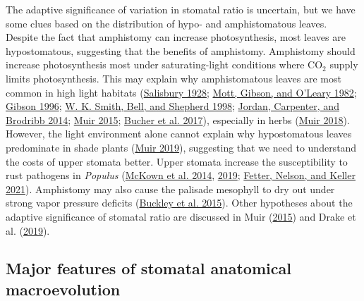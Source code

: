 \documentclass[
  12pt,
]{article}
\begin{document}
The adaptive significance of variation in stomatal ratio is uncertain, but we have some clues based on the distribution of hypo- and amphistomatous leaves. Despite the fact that amphistomy can increase photosynthesis, most leaves are hypostomatous, suggesting that the benefits of amphistomy. Amphistomy should increase photosynthesis most under saturating-light conditions where CO\(_2\) supply limits photosynthesis. This may explain why amphistomatous leaves are most common in high light habitats (\protect\hyperlink{ref-salisbury_i_1928}{Salisbury 1928}; \protect\hyperlink{ref-mott_adaptive_1982}{Mott, Gibson, and O'Leary 1982}; \protect\hyperlink{ref-gibson_structure-function_1996}{Gibson 1996}; \protect\hyperlink{ref-smith_associations_1998}{W. K. Smith, Bell, and Shepherd 1998}; \protect\hyperlink{ref-jordan_using_2014}{Jordan, Carpenter, and Brodribb 2014}; \protect\hyperlink{ref-muir_making_2015}{Muir 2015}; \protect\hyperlink{ref-bucher_stomatal_2017}{Bucher et al. 2017}), especially in herbs (\protect\hyperlink{ref-muir_light_2018}{Muir 2018}). However, the light environment alone cannot explain why hypostomatous leaves predominate in shade plants (\protect\hyperlink{ref-muir_is_2019}{Muir 2019}), suggesting that we need to understand the costs of upper stomata better. Upper stomata increase the susceptibility to rust pathogens in \emph{Populus} (\protect\hyperlink{ref-mckown_association_2014}{McKown et al. 2014}, \protect\hyperlink{ref-mckown_role_2019}{2019}; \protect\hyperlink{ref-fetter_growthdefense_2021}{Fetter, Nelson, and Keller 2021}). Amphistomy may also cause the palisade mesophyll to dry out under strong vapor pressure deficits (\protect\hyperlink{ref-buckley_how_2015}{Buckley et al. 2015}). Other hypotheses about the adaptive significance of stomatal ratio are discussed in Muir (\protect\hyperlink{ref-muir_making_2015}{2015}) and Drake et al. (\protect\hyperlink{ref-drake_two_2019}{2019}).

\hypertarget{major-features-of-stomatal-anatomical-macroevolution}{%
\subsection{Major features of stomatal anatomical macroevolution}\label{major-features-of-stomatal-anatomical-macroevolution}}
\end{document}
